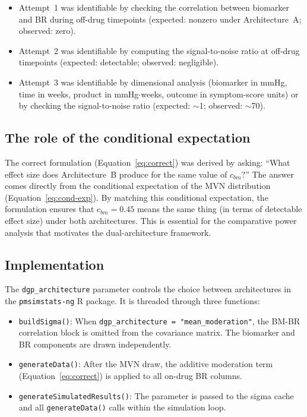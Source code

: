 \documentclass[11pt]{article}
\begin{document}
\begin{itemize}[leftmargin=2em]

\item Attempt~1 was identifiable by checking the correlation
  between biomarker and BR during off-drug timepoints
  (expected: nonzero under Architecture~A; observed: zero).

\item Attempt~2 was identifiable by computing the
  signal-to-noise ratio at off-drug timepoints (expected:
  detectable; observed: negligible).

\item Attempt~3 was identifiable by dimensional analysis
  (biomarker in mmHg, time in weeks, product in
  mmHg$\cdot$weeks, outcome in symptom-score units) or by
  checking the signal-to-noise ratio (expected: $\sim$1;
  observed: $\sim$70).

\end{itemize}

\subsection{The role of the conditional expectation}

The correct formulation (Equation~\ref{eq:correct}) was
derived by asking: ``What effect size does Architecture~B
produce for the same value of $c_{bm}$?'' The answer comes
directly from the conditional expectation of the MVN
distribution (Equation~\ref{eq:cond-exp}). By matching this
conditional expectation, the formulation ensures that $c_{bm} = 0.45$
means the same thing (in terms of detectable effect
size) under both architectures. This is essential for the
comparative power analysis that motivates the dual-architecture
framework.

\subsection{Implementation}

The \texttt{dgp\_architecture} parameter controls the choice
between architectures in the \texttt{pmsimstats-ng} R
package. It is threaded through three functions:

\begin{itemize}[leftmargin=2em]

\item \texttt{buildSigma()}: When
  \texttt{dgp\_architecture = "mean\_moderation"}, the BM-BR
  correlation block is omitted from the covariance matrix.
  The biomarker and BR components are drawn independently.

\item \texttt{generateData()}: After the MVN draw, the
  additive moderation term
  (Equation~\ref{eq:correct}) is applied to all on-drug BR
  columns.

\item \texttt{generateSimulatedResults()}: The parameter is
  passed to the sigma cache and all \texttt{generateData()}
  calls within the simulation loop.

\end{itemize}
\end{document}
